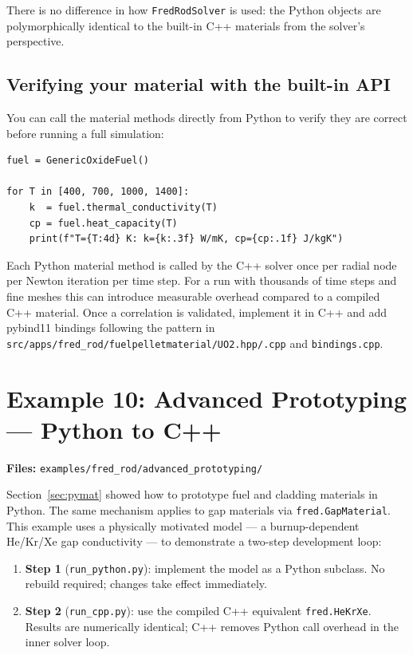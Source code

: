 \documentclass[11pt,a4paper]{article}
\begin{document}
There is no difference in how \texttt{FredRodSolver} is used: the Python
objects are polymorphically identical to the built-in C++ materials from the
solver's perspective.

\subsection{Verifying your material with the built-in API}

You can call the material methods directly from Python to verify they are
correct before running a full simulation:

\begin{lstlisting}
fuel = GenericOxideFuel()

for T in [400, 700, 1000, 1400]:
    k  = fuel.thermal_conductivity(T)
    cp = fuel.heat_capacity(T)
    print(f"T={T:4d} K: k={k:.3f} W/mK, cp={cp:.1f} J/kgK")
\end{lstlisting}

\begin{warningbox}
  Each Python material method is called by the C++ solver once per radial
  node per Newton iteration per time step.  For a run with thousands of time
  steps and fine meshes this can introduce measurable overhead compared to a
  compiled C++ material.  Once a correlation is validated, implement it in
  C++ and add pybind11 bindings following the pattern in
  \texttt{src/apps/fred\_rod/fuelpelletmaterial/UO2.hpp/.cpp} and
  \texttt{bindings.cpp}.
\end{warningbox}

\section{Example 10: Advanced Prototyping --- Python to C++}
\label{sec:proto}

\textbf{Files:} \texttt{examples/fred\_rod/advanced\_prototyping/}

\medskip
Section~\ref{sec:pymat} showed how to prototype fuel and cladding materials in
Python.  The same mechanism applies to gap materials via \texttt{fred.GapMaterial}.
This example uses a physically motivated model --- a burnup-dependent He/Kr/Xe
gap conductivity --- to demonstrate a two-step development loop:

\begin{enumerate}
  \item \textbf{Step 1} (\texttt{run\_python.py}): implement the model as a
        Python subclass.  No rebuild required; changes take effect immediately.
  \item \textbf{Step 2} (\texttt{run\_cpp.py}): use the compiled C++ equivalent
        \texttt{fred.HeKrXe}.  Results are numerically identical; C++ removes
        Python call overhead in the inner solver loop.
\end{enumerate}
\end{document}
